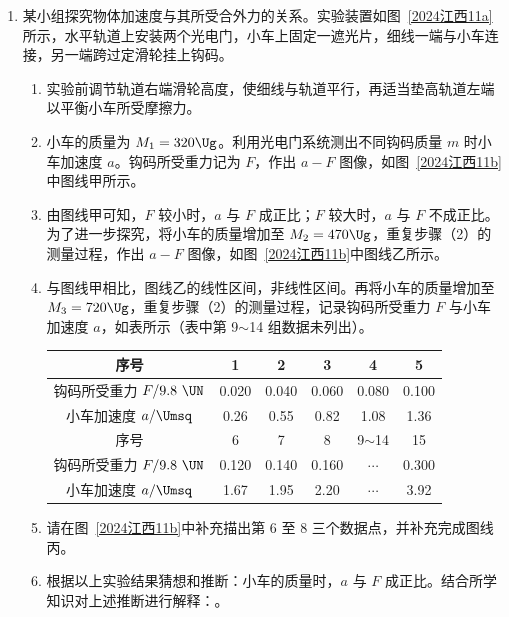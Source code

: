 \documentclass[\gkver]{gaokaozhenti}
\begin{document}
\begin{enumerate}
\item
某小组探究物体加速度与其所受合外力的关系。实验装置如图~\ref{2024江西11a}所示，水平轨道上安装两个光电门，小车上固定一遮光片，细线一端与小车连接，另一端跨过定滑轮挂上钩码。
\begin{enumerate}
	\item
	实验前调节轨道右端滑轮高度，使细线与轨道平行，再适当垫高轨道左端以平衡小车所受摩擦力。
	\item
	小车的质量为 $M_{1} = 320 \Ug$。利用光电门系统测出不同钩码质量 $m$ 时小车加速度 $a$。钩码所受重力记为 $F$，作出 $a - F$ 图像，如图~\ref{2024江西11b}中图线甲所示。
	\item
	由图线甲可知，$F$ 较小时，$a$ 与 $F$ 成正比；$F$ 较大时，$a$ 与 $F$ 不成正比。为了进一步探究，将小车的质量增加至 $M_{2} = 470 \Ug$，重复步骤（2）的测量过程，作出 $a - F$ 图像，如图~\ref{2024江西11b}中图线乙所示。
	\item
	与图线甲相比，图线乙的线性区间\tkanswer[2cm]{}，非线性区间\tkanswer[2cm]{}。再将小车的质量增加至 $M_{3} = 720 \Ug$，重复步骤（2）的测量过程，记录钩码所受重力 $F$ 与小车加速度 $a$，如表所示（表中第 9$\sim$14 组数据未列出）。
	\begin{center}
	\begin{tabular}{|c|c|c|c|c|c|}
	\hline
	序号 & 1 & 2 & 3 & 4 & 5 \\
	\hline
	钩码所受重力 $F/9.8\ \UN$ & 0.020 & 0.040 & 0.060 & 0.080 & 0.100 \\
	\hline
	小车加速度 $a/\Umsq$ & 0.26 & 0.55 & 0.82 & 1.08 & 1.36 \\
	\hline
	序号 & 6 & 7 & 8 & 9$\sim$14 & 15 \\
	\hline
	钩码所受重力 $F/9.8\ \UN$ & 0.120 & 0.140 & 0.160 & $\cdots$ & 0.300 \\
	\hline
	小车加速度 $a/\Umsq$ & 1.67 & 1.95 & 2.20 & $\cdots$ & 3.92 \\
	\hline
	\end{tabular}
	\end{center}
	\item
	请在图~\ref{2024江西11b}中补充描出第 6 至 8 三个数据点，并补充完成图线丙\tkanswer[2cm]{}。
	\item
	根据以上实验结果猜想和推断：小车的质量\tkanswer[2cm]{}时，$a$ 与 $F$ 成正比。结合所学知识对上述推断进行解释：\tkanswer[4cm]{}。
\end{enumerate}
\twopicture[labelA=2024江西11a, labelB=2024江西11b, wA=7.0cm, wB=6.4cm, align=right]

\end{enumerate}
\end{document}
